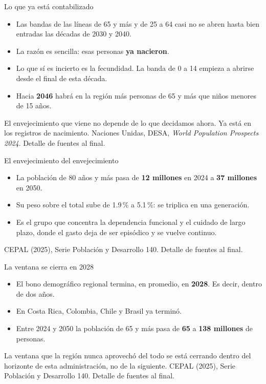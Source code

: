 \documentclass[aspectratio=169,11pt]{beamer}
\newcommand{\cifra}[1]{\textcolor{dato}{\textbf{#1}}}
\newcommand{\clave}[1]{\textcolor{acento}{\textbf{#1}}}
\newcommand{\cierre}[1]{\vspace{0.5em}\par{#1}}
\newcommand{\pie}[1]{\vfill{\scriptsize\textcolor{grisfino}{#1}}}
\begin{document}
\begin{frame}{Lo que ya está contabilizado}
  \begin{itemize}
    \item Las bandas de las líneas de 65 y más y de 25 a 64 casi no se abren hasta bien entradas las décadas de 2030 y 2040.
    \item La razón es sencilla: esas personas \clave{ya nacieron}.
    \item Lo que sí es incierto es la fecundidad. La banda de 0 a 14 empieza a abrirse desde el final de esta década.
    \item Hacia \cifra{2046} habrá en la región más personas de 65 y más que niños menores de 15 años.
  \end{itemize}
  \cierre{El envejecimiento que viene no depende de lo que decidamos ahora. Ya está en los registros de nacimiento.}
  \pie{Naciones Unidas, DESA, \emph{World Population Prospects 2024}. Detalle de fuentes al final.}
\end{frame}

\begin{frame}{El envejecimiento del envejecimiento}
  \begin{itemize}
    \item La población de 80 años y más pasa de \cifra{12 millones} en 2024 a \cifra{37 millones} en 2050.
    \item Su peso sobre el total sube de 1.9\,\% a 5.1\,\%: se triplica en una generación.
    \item Es el grupo que concentra la dependencia funcional y el cuidado de largo plazo, donde el gasto deja de ser episódico y se vuelve continuo.
  \end{itemize}
  \pie{CEPAL (2025), Serie Población y Desarrollo 140. Detalle de fuentes al final.}
\end{frame}

\begin{frame}{La ventana se cierra en 2028}
  \begin{itemize}
    \item El bono demográfico regional termina, en promedio, en \cifra{2028}. Es decir, dentro de dos años.
    \item En Costa Rica, Colombia, Chile y Brasil ya terminó.
    \item Entre 2024 y 2050 la población de 65 y más pasa de \cifra{65} a \cifra{138 millones} de personas.
  \end{itemize}
  \cierre{La ventana que la región nunca aprovechó del todo se está cerrando dentro del horizonte de esta administración, no de la siguiente.}
  \pie{CEPAL (2025), Serie Población y Desarrollo 140. Detalle de fuentes al final.}
\end{frame}
\end{document}
